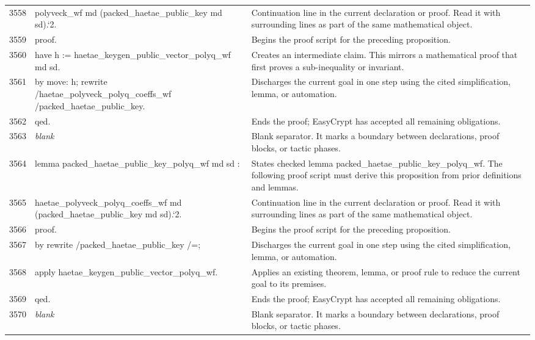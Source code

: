 \documentclass[10pt]{article}
\begin{document}
\begin{longtable}{r L{0.53\textwidth} L{0.37\textwidth}}
3558 & {\ttfamily\scriptsize   polyveck\_wf md (packed\_haetae\_public\_key md sd).`2.} & Continuation line in the current declaration or proof.  Read it with surrounding lines as part of the same mathematical object. \\
3559 & {\ttfamily\scriptsize proof.} & Begins the proof script for the preceding proposition. \\
3560 & {\ttfamily\scriptsize have h := haetae\_keygen\_public\_vector\_polyq\_wf md sd.} & Creates an intermediate claim.  This mirrors a mathematical proof that first proves a sub-inequality or invariant. \\
3561 & {\ttfamily\scriptsize by move: h; rewrite /haetae\_polyveck\_polyq\_coeffs\_wf /packed\_haetae\_public\_key.} & Discharges the current goal in one step using the cited simplification, lemma, or automation. \\
3562 & {\ttfamily\scriptsize qed.} & Ends the proof; EasyCrypt has accepted all remaining obligations. \\
3563 & {\ttfamily\scriptsize \emph{blank}} & Blank separator.  It marks a boundary between declarations, proof blocks, or tactic phases. \\
3564 & {\ttfamily\scriptsize lemma packed\_haetae\_public\_key\_polyq\_wf md sd :} & States checked lemma packed\_haetae\_public\_key\_polyq\_wf.  The following proof script must derive this proposition from prior definitions and lemmas. \\
3565 & {\ttfamily\scriptsize   haetae\_polyveck\_polyq\_coeffs\_wf md (packed\_haetae\_public\_key md sd).`2.} & Continuation line in the current declaration or proof.  Read it with surrounding lines as part of the same mathematical object. \\
3566 & {\ttfamily\scriptsize proof.} & Begins the proof script for the preceding proposition. \\
3567 & {\ttfamily\scriptsize by rewrite /packed\_haetae\_public\_key /=;} & Discharges the current goal in one step using the cited simplification, lemma, or automation. \\
3568 & {\ttfamily\scriptsize    apply haetae\_keygen\_public\_vector\_polyq\_wf.} & Applies an existing theorem, lemma, or proof rule to reduce the current goal to its premises. \\
3569 & {\ttfamily\scriptsize qed.} & Ends the proof; EasyCrypt has accepted all remaining obligations. \\
3570 & {\ttfamily\scriptsize \emph{blank}} & Blank separator.  It marks a boundary between declarations, proof blocks, or tactic phases. \\

\end{longtable}
\end{document}
